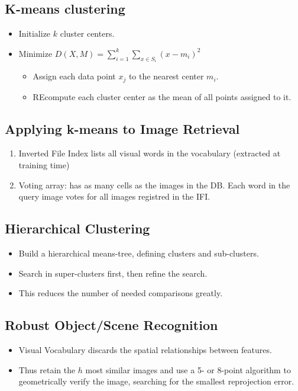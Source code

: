 \documentclass[10pt,a4paper]{scrartcl}
\begin{document}
\begin{multicols*}{2}
\subsection{K-means clustering}

\begin{itemize}
\item Initialize $k$ cluster centers.
\item Minimize $D(X,M) = \sum\limits_{i=1}^k\sum\limits_{x\in S_i}(x-m_i)^2$
\begin{itemize}
\item Assign each data point $x_j$ to the nearest center $m_i$.
\item REcompute each cluster center as the mean of all points assigned to it.
\end{itemize}
\end{itemize}

\subsection{Applying k-means to Image Retrieval}

\begin{enumerate}
\item Inverted File Index lists all visual words in the vocabulary (extracted at training time)
\item Voting array: has as many cells as the images in the DB. Each word in the query image votes for all images registred in the IFI.
\end{enumerate}

\subsection{Hierarchical Clustering}

\begin{itemize}
\item Build a hierarchical means-tree, defining clusters and sub-clusters.
\item Search in super-clusters first, then refine the search.
\item This reduces the number of needed comparisons greatly.
\end{itemize}

\subsection{Robust Object/Scene Recognition}

\begin{itemize}
\item Visual Vocabulary discards the spatial relationships between features.
\item Thus retain the $h$ most similar images and use a 5- or 8-point algorithm to geometrically verify the image, searching for the smallest reprojection error.
\end{itemize}


\end{multicols*}
\end{document}
